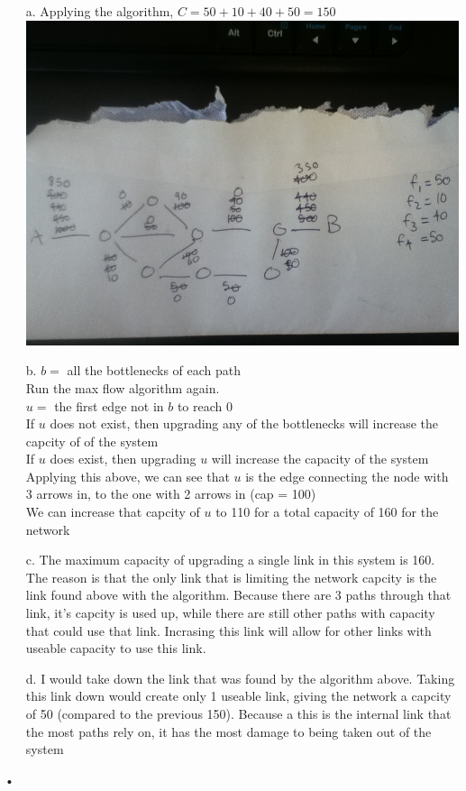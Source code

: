 \documentclass[11pt]{article}
\theoremstyle{definition}
\begin{document}
\begin{enumerate}
	\item[a.] Applying the algorithm, $C = 50 + 10 + 40 + 50 = 150$\\
		\includegraphics*[scale=0.3]{5graph.jpg}
	\item[b.] $b = $ all the bottlenecks of each path\\
	Run the max flow algorithm again.\\
	$u = $ the first edge not in $b$ to reach 0\\
	If $u$ does not exist, then upgrading any of the bottlenecks will increase the capcity of of the system\\
	If $u$ does exist, then upgrading $u$ will increase the capacity of the system
	Applying this above, we can see that $u$ is the edge connecting the node with 3 arrows in, to the one with 2 arrows in (cap = 100)\\
	We can increase that capcity of $u$ to 110 for a total capacity of 160 for the network
	
	\item[c.] The maximum capacity of upgrading a single link in this system is 160.  The reason is that the only link that is 
	limiting the network capcity is the link found above with the algorithm.  Because there are 3 paths through that link, it's capcity
	is used up, while there are still other paths with capacity that could use that link.  Incrasing this link will allow for other links
	with useable capacity to use this link.
	
	\item[d.] I would take down the link that was found by the algorithm above.  Taking this link down would create only 1 useable link,
	giving the network a capcity of 50 (compared to the previous 150).  Because a this is the internal link that the most paths rely on, it
	has the most damage to being taken out of the system
\end{enumerate}•
\end{document}
